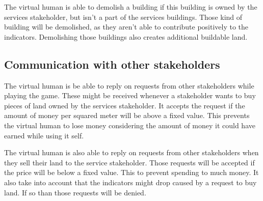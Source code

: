 The virtual human is able to demolish a building if this building is owned by the services stakeholder, but isn't a part of the services buildings. Those kind of building will be demolished, as they aren't able to contribute positively to the indicators. Demolishing those buildings also creates additional buildable land.

\subsection{Communication with other stakeholders}
The virtual human is be able to reply on requests from other stakeholders while playing the game. These might be received whenever a stakeholder wants to buy pieces of land owned by the services stakeholder. It accepts the request if the amount of money per squared meter will be above a fixed value. This prevents the virtual human to lose money considering the amount of money it could have earned while using it self.

The virtual human is also able to reply on requests from other stakeholders when they sell their land to the service stakeholder. Those requests will be accepted if the price will be below a fixed value. This to prevent spending to much money. It also take into account that the indicators might drop caused by a request to buy land. If so than those requests will be denied.